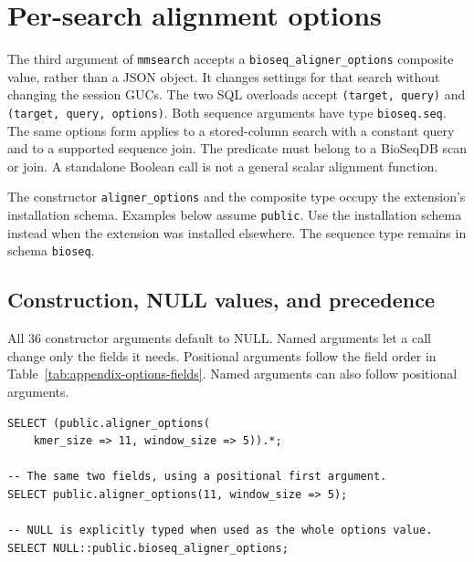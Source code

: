 \section{Per-search alignment options}
\label{sec:appendix-search-options}

The third argument of \texttt{mmsearch} accepts a
\texttt{bioseq\_aligner\_options} composite value, rather than a JSON object.
It changes settings for
that search without changing the session GUCs. The two SQL overloads accept
\texttt{(target, query)} and \texttt{(target, query, options)}. Both sequence
arguments have type \texttt{bioseq.seq}. The same options form applies to
a stored-column search with a constant query and to a supported sequence join.
The predicate must belong to a BioSeqDB scan or join. A standalone Boolean
call is not a general scalar alignment function.

The constructor \texttt{aligner\_options} and the composite type occupy the
extension's installation schema. Examples below assume \texttt{public}.
Use the installation schema instead when the extension was installed
elsewhere. The sequence type remains in schema \texttt{bioseq}.

\subsection{Construction, NULL values, and precedence}
\label{sec:appendix-options-precedence}

All 36 constructor arguments default to NULL. Named arguments let a call
change only the fields it needs. Positional arguments follow the field order
in Table~\ref{tab:appendix-options-fields}. Named arguments can also follow
positional arguments.

\par\noindent\begin{minipage}{\linewidth}
\begin{lstlisting}[style=bioseq-appendix-sql,
  caption={Construct and inspect an options value.},
  label={lst:appendix-options-construction}]
SELECT (public.aligner_options(
    kmer_size => 11, window_size => 5)).*;

-- The same two fields, using a positional first argument.
SELECT public.aligner_options(11, window_size => 5);

-- NULL is explicitly typed when used as the whole options value.
SELECT NULL::public.bioseq_aligner_options;
\end{lstlisting}
\end{minipage}


